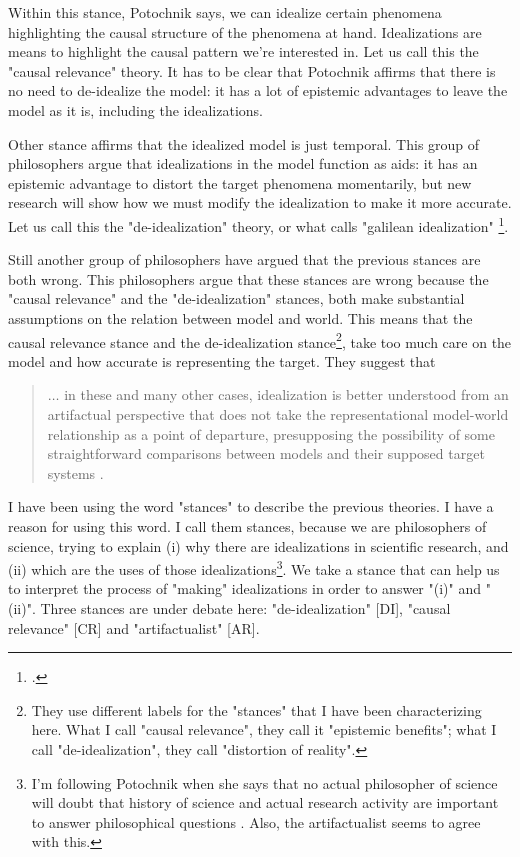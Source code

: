 Within this stance, Potochnik says, we can idealize certain phenomena highlighting the causal structure of the phenomena at hand.
Idealizations are means to highlight the causal pattern we're interested in.
Let us call this the "causal relevance" theory.
It has to be clear that Potochnik affirms that there is no need to de-idealize the model: it has a lot of epistemic advantages to leave the model as it is, including the idealizations.

Other stance affirms that the idealized model is just temporal.
This group of philosophers argue that idealizations in the model function as aids: it has an epistemic advantage to distort the target phenomena momentarily, but new research will show how we must modify the idealization to make it more accurate.
Let us call this the "de-idealization" theory, or what \citeauthor{Weisberg2007} calls "galilean idealization" \footcite{Weisberg2007}.

Still another group of philosophers have argued that the previous stances are both wrong.
This philosophers argue that these stances are wrong because the "causal relevance" and the "de-idealization" stances, both make substantial assumptions on the relation between model and world.
This means that the causal relevance stance and the de-idealization stance\footnote{They use different labels for the "stances" that I have been characterizing here. What I call "causal relevance", they call it "epistemic benefits"; what I call "de-idealization", they call "distortion of reality".}, take too much care on the model and how accurate is representing the target.
They suggest that

\begin{quote}
	$\ldots$ in these and many other cases, idealization is better understood from an artifactual perspective that does not take the representational model-world relationship as a point of departure, presupposing the possibility of some straightforward comparisons between models and their supposed target systems \parencite[][p. 2]{Carrillo2021-CARAAP-12}.
\end{quote}

I have been using the word "stances" to describe the previous theories.
I have a reason for using this word.
I call them stances, because we are philosophers of science, trying to explain (i) why there are idealizations in scientific research, and (ii) which are the uses of those idealizations\footnote{I'm following Potochnik when she says that no actual philosopher of science will doubt that history of science and actual research activity are important to answer philosophical questions \citeyear[cfr.][p. 9]{Potochnik2017-POTIAT-3}. Also, the artifactualist seems to agree with this.}.
We take a stance that can help us to interpret the process of "making" idealizations in order to answer "(i)" and "(ii)".
Three stances are under debate here: "de-idealization" [DI], "causal relevance" [CR] and "artifactualist" [AR].

